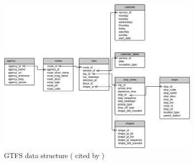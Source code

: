 \documentclass[12pt, a4paper]{report}
\begin{document}
\begin{figure}[H]
    \centering
    \includegraphics[width=10cm]{Images/GTFS-data-format.png}
    \caption{GTFS data structure (\cite{pereiraExploringTimeGeography2023} cited by \cite{pereiraIntroductionUrbanAccessibility2023a})}
    \label{fig:GTFS_structure}
\end{figure}
\end{document}
